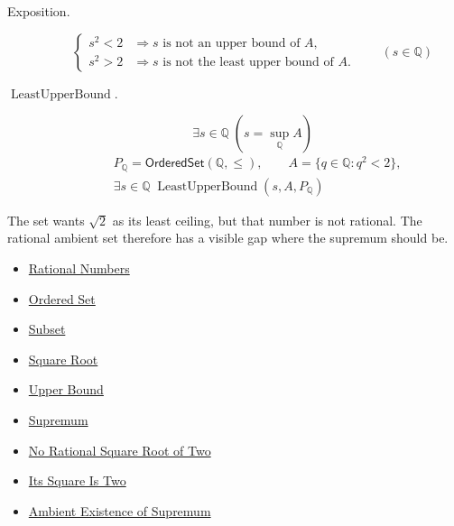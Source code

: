 \begin{remark*}
\begin{description}
  \item[Exposition.]
\[
\begin{cases}
s^2<2 &\Longrightarrow s\text{ is not an upper bound of }A,\\
s^2>2 &\Longrightarrow s\text{ is not the least upper bound of }A.
\end{cases}
\qquad(s\in\mathbb{Q})
\]


  \item[\(\operatorname{LeastUpperBound}.\)]
  \[
\exists s\in\mathbb{Q}\;(s=\sup_{\mathbb{Q}}A)
\]
\[
\begin{aligned}
&P_{\mathbb{Q}}=\mathsf{OrderedSet}(\mathbb{Q},\leq),\qquad
A=\{q\in\mathbb{Q}:q^2<2\},\\
&\exists s\in\mathbb{Q}\;\operatorname{LeastUpperBound}(s,A,P_{\mathbb{Q}})
\end{aligned}
\]
\end{description}
\end{remark*}

\begin{remark*}[Interpretation]
The set wants $\sqrt{2}$ as its least ceiling, but that number is not rational. The rational ambient set therefore has a visible gap where the supremum should be.
\end{remark*}

\begin{dependencies}
\begin{itemize}
  \item \hyperref[def:rationals]{Rational Numbers}
  \item \hyperref[def:ordered-set]{Ordered Set}
  \item \hyperref[def:subset]{Subset}
  \item \hyperref[def:square-root]{Square Root}
  \item \hyperref[def:real-upper-bound]{Upper Bound}
  \item \hyperref[def:supremum]{Supremum}
  \item \hyperref[thm:no-rational-square-root-of-two]{No Rational Square Root of Two}
  \item \hyperref[thm:sqrt-two-squared-is-two]{Its Square Is Two}
  \item \hyperref[thm:ambient-existence-supremum]{Ambient Existence of Supremum}
\end{itemize}
\end{dependencies}






